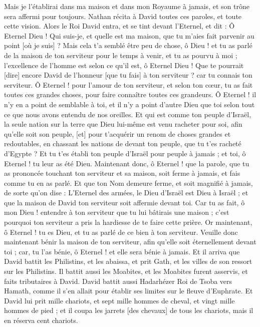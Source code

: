 \begin{multicols}{2}
Mais je l'établirai dans ma maison et dans mon Royaume à jamais, et son trône sera affermi pour toujours.
Nathan récita à David toutes ces paroles, et toute cette vision.
Alors le Roi David entra, et se tint devant l'Eternel, et dit : Ô Eternel Dieu ! Qui suis-je, et quelle est ma maison, que tu m'aies fait parvenir au point [où je suis] ?
Mais cela t'a semblé être peu de chose, ô Dieu ! et tu as parlé de la maison de ton serviteur pour le temps à venir, et tu as pourvu à moi ; l'excellence de l'homme est selon ce qu'il est, ô Eternel Dieu !
Que te pourrait [dire] encore David de l'honneur [que tu fais] à ton serviteur ? car tu connais ton serviteur.
Ô Eternel ! pour l'amour de ton serviteur, et selon ton cœur, tu as fait toutes ces grandes choses, pour faire connaître toutes ces grandeurs.
Ô Eternel ! il n'y en a point de semblable à toi, et il n'y a point d'autre Dieu que toi selon tout ce que nous avons entendu de nos oreilles.
Et qui est comme ton peuple d'Israël, la seule nation sur la terre que Dieu lui-même est venu racheter pour soi, afin qu'elle soit son peuple, [et] pour t'acquérir un renom de choses grandes et redoutables, en chassant les nations de devant ton peuple, que tu t'es racheté d'Egypte ?
Et tu t'es établi ton peuple d'Israël pour peuple à jamais ; et toi, ô Eternel ! tu leur as été Dieu.
Maintenant donc, ô Eternel ! que la parole, que tu as prononcée touchant ton serviteur et sa maison, soit ferme à jamais, et fais comme tu en as parlé.
Et que ton Nom demeure ferme, et soit magnifié à jamais, de sorte qu'on dise : L'Eternel des armées, le Dieu d'Israël est Dieu à Israël ; et que la maison de David ton serviteur soit affermie devant toi.
Car tu as fait, ô mon Dieu ! entendre à ton serviteur que tu lui bâtirais une maison ; c'est pourquoi ton serviteur a pris la hardiesse de te faire cette prière.
Or maintenant, ô Eternel ! tu es Dieu, et tu as parlé de ce bien à ton serviteur.
Veuille donc maintenant bénir la maison de ton serviteur, afin qu'elle soit éternellement devant toi ; car, tu l'as bénie, ô Eternel ! et elle sera bénie à jamais.
\VerseOne{}Et il arriva que David battit les Philistins, et les abaissa, et prit Gath, et les villes de son ressort sur les Philistins.
Il battit aussi les Moabites, et les Moabites furent asservis, et faits tributaires à David.
David battit aussi Hadarhézer Roi de Tsoba vers Hamath, comme il s'en allait pour établir ses limites sur le fleuve d'Euphrate.
Et David lui prit mille chariots, et sept mille hommes de cheval, et vingt mille hommes de pied ; et il coupa les jarrets [des chevaux] de tous les chariots, mais il en réserva cent chariots.

\end{multicols}

